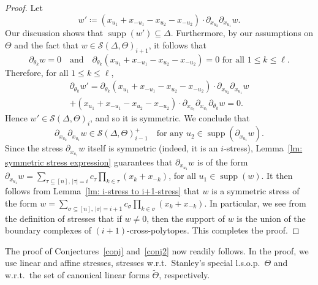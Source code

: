 \documentclass[ALCO,ThmDefs,Unicode,epreuves]{cedram}
\DeclareMathOperator{\supp}{supp}
\begin{document}
\begin{proof}
	Let $$w'\coloneqq (x_{u_1}+x_{-u_1}-x_{u_2}-x_{-u_2})\cdot \partial_{x_{u_2}}\partial_{x_{u_1}} w.$$ Our discussion shows that $\supp(w')\subseteq \Delta$. Furthermore, by our assumptions on $\Theta$ and the fact that $w\in \mathcal{S}(\Delta, \Theta)_{i+1}$, it follows that $$\partial_{\theta_k} w=0 \quad \mbox{and} \quad \partial_{\theta_k}(x_{u_1}+x_{-u_1}-x_{u_2}-x_{-u_2})=0 \mbox{ for all $1\leq k\leq \ell$.}$$ Therefore, for all $1\leq k\leq \ell$,
\begin{multline*}
\partial_{\theta_k} w' =
\partial_{\theta_k}(x_{u_1}+x_{-u_1}-x_{u_2}-x_{-u_2}) \cdot \partial_{x_{u_2}}\partial_{x_{u_1}} w \\ 
+(x_{u_1} + x_{-u_1}-x_{u_2}-x_{-u_2}) \cdot\partial_{x_{u_2}}\partial_{x_{u_1}} \partial_{\theta_k}w = 0.
\end{multline*}
	Hence $w'\in \mathcal{S}(\Delta, \Theta)_i$, and so it is symmetric. We conclude that $$\partial_{x_{u_2}}\partial_{x_{u_1}} w\in \mathcal{S}(\Delta, \Theta)^+_{i-1} \quad \mbox{for any $u_2\in \supp(\partial_{x_{u_1}} w)$.}$$ Since the stress $\partial_{x_{u_1}}w$ itself is symmetric (indeed, it is an $i$-stress), Lemma~\ref{lm: symmetric stress expression} guarantees that $\partial_{x_{u_1}}w$ is of the form $\partial_{x_{u_1}} w=\sum_{\tau\subseteq [n], \, |\tau|=i} c_\tau \prod_{k\in \tau} (x_k+x_{-k})$, for all $u_1\in\supp(w)$. It then follows from Lemma~\ref{lm: i-stress to i+1-stress} that $w$ is a symmetric stress of the form $w=\sum_{\sigma\subseteq [n], \, |\sigma|=i+1} c_\sigma \prod_{k\in \sigma} (x_k+x_{-k})$. In particular, we see from the definition of stresses that if $w\neq 0$, then the support of $w$ is the union of the boundary complexes of $(i+1)$-cross-polytopes. This completes the proof.
\end{proof}

The proof of Conjectures~\ref{conj} and~\ref{conj2} now readily follows. In the proof, we use linear and affine stresses, \ie stresses w.r.t.~Stanley's special l.s.o.p.~$\Theta$ and w.r.t.~the set of canonical linear forms $\widetilde{\Theta}$, respectively.
\end{document}
